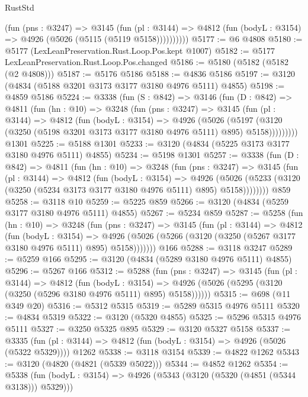 \begin{lexlean}{RustStd}
\begin{coremodule}
            (fun (pns : @3247) =>
            @3145
              (fun (pl : @3144) =>
              @4812 (fun (bodyL : @3154) => @4926 (@5026 (@5115 (@5119 @5158))))))))))
@5177 := @6 @4808
@5180 := @5177 (LexLeanPreservation.Rust.Loop.Pos.kept @1007)
@5182 := @5177 LexLeanPreservation.Rust.Loop.Pos.changed
@5186 := @5180 (@5182 (@5182 (@2 @4808)))
@5187 := @5176 @5186
@5188 := @4836 @5186
@5197 := @3120 (@4834 (@5188 @3201 @3173 @3177 @3180 @4976 @5111) @4855)
@5198 := @4859 @5186
@5224 := @3338
    (fun (S : @842) =>
    @3146
      (fun (D : @842) =>
      @4811
        (fun (hn : @10) =>
        @3248
          (fun (pns : @3247) =>
          @3145
            (fun (pl : @3144) =>
            @4812
              (fun (bodyL : @3154) =>
              @4926
                (@5026
                  (@5197
                    (@3120 (@3250 (@5198 @3201 @3173 @3177 @3180 @4976 @5111) @895) @5158)))))))))
    @1301
@5225 := @5188 @1301
@5233 := @3120 (@4834 (@5225 @3173 @3177 @3180 @4976 @5111) @4855)
@5234 := @5198 @1301
@5257 := @3338
    (fun (D : @842) =>
    @4811
      (fun (hn : @10) =>
      @3248
        (fun (pns : @3247) =>
        @3145
          (fun (pl : @3144) =>
          @4812
            (fun (bodyL : @3154) =>
            @4926
              (@5026 (@5233 (@3120 (@3250 (@5234 @3173 @3177 @3180 @4976 @5111) @895) @5158))))))))
    @859
@5258 := @3118 @10
@5259 := @5225 @859
@5266 := @3120 (@4834 (@5259 @3177 @3180 @4976 @5111) @4855)
@5267 := @5234 @859
@5287 := @5258
    (fun (hn : @10) =>
    @3248
      (fun (pns : @3247) =>
      @3145
        (fun (pl : @3144) =>
        @4812
          (fun (bodyL : @3154) =>
          @4926 (@5026 (@5266 (@3120 (@3250 (@5267 @3177 @3180 @4976 @5111) @895) @5158)))))))
    @166
@5288 := @3118 @3247
@5289 := @5259 @166
@5295 := @3120 (@4834 (@5289 @3180 @4976 @5111) @4855)
@5296 := @5267 @166
@5312 := @5288
    (fun (pns : @3247) =>
    @3145
      (fun (pl : @3144) =>
      @4812
        (fun (bodyL : @3154) =>
        @4926 (@5026 (@5295 (@3120 (@3250 (@5296 @3180 @4976 @5111) @895) @5158))))))
@5315 := @698 (@11 @349 @20)
@5316 := @5312 @5315
@5319 := @5289 @5315 @4976 @5111
@5320 := @4834 @5319
@5322 := @3120 (@5320 @4855)
@5325 := @5296 @5315 @4976 @5111
@5327 := @3250 @5325 @895
@5329 := @3120 @5327 @5158
@5337 := @3335
    (fun (pl : @3144) => @4812 (fun (bodyL : @3154) => @4926 (@5026 (@5322 @5329))))
    @1262
@5338 := @3118 @3154
@5339 := @4822 @1262
@5343 := @3120 (@4820 (@4821 (@5339 @5022)))
@5344 := @4852 @1262
@5354 := @5338
    (fun (bodyL : @3154) => @4926 (@5343 (@3120 (@5320 (@4851 (@5344 @3138))) @5329)))

\end{coremodule}
\end{lexlean}

